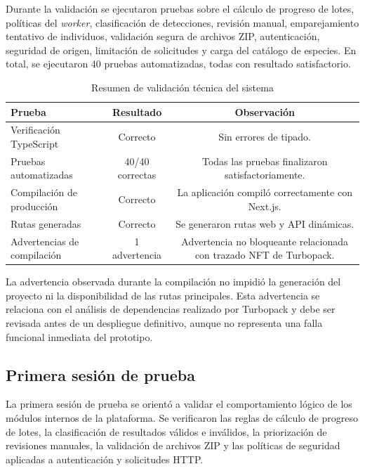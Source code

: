 Durante la validación se ejecutaron pruebas sobre el cálculo de progreso de lotes, políticas del \textit{worker}, clasificación de detecciones, revisión manual, emparejamiento tentativo de individuos, validación segura de archivos ZIP, autenticación, seguridad de origen, limitación de solicitudes y carga del catálogo de especies. En total, se ejecutaron 40 pruebas automatizadas, todas con resultado satisfactorio.

\begin{table}[H]
\centering
\caption{Resumen de validación técnica del sistema}
\label{tab:validacion_tecnica}
\begin{tabular}{lcc}
\toprule
\textbf{Prueba} & \textbf{Resultado} & \textbf{Observación} \\
\midrule
Verificación TypeScript & Correcto & Sin errores de tipado. \\
Pruebas automatizadas & 40/40 correctas & Todas las pruebas finalizaron satisfactoriamente. \\
Compilación de producción & Correcto & La aplicación compiló correctamente con Next.js. \\
Rutas generadas & Correcto & Se generaron rutas web y API dinámicas. \\
Advertencias de compilación & 1 advertencia & Advertencia no bloqueante relacionada con trazado NFT de Turbopack. \\
\bottomrule
\end{tabular}
\end{table}

La advertencia observada durante la compilación no impidió la generación del proyecto ni la disponibilidad de las rutas principales. Esta advertencia se relaciona con el análisis de dependencias realizado por Turbopack y debe ser revisada antes de un despliegue definitivo, aunque no representa una falla funcional inmediata del prototipo.

\subsection{Primera sesión de prueba}
\label{subsec:primera_sesion_prueba}

La primera sesión de prueba se orientó a validar el comportamiento lógico de los módulos internos de la plataforma. Se verificaron las reglas de cálculo de progreso de lotes, la clasificación de resultados válidos e inválidos, la priorización de revisiones manuales, la validación de archivos ZIP y las políticas de seguridad aplicadas a autenticación y solicitudes HTTP.

